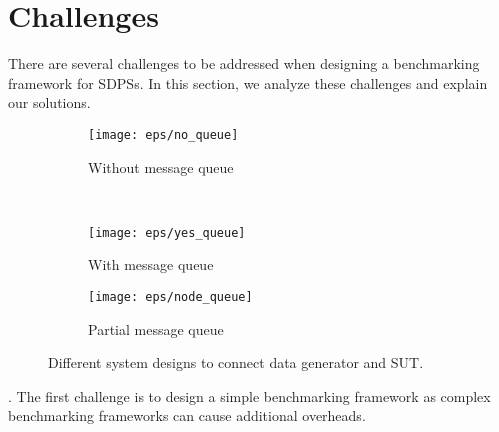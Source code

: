 \section{Challenges}
\label{chal}
There are several challenges to be addressed when designing a benchmarking framework for SDPSs. In this section, we analyze these challenges and explain our solutions.

\begin{figure*}
    \centering
    \begin{subfigure}[b]{0.32\textwidth}
        \texttt{[image: eps/no\_queue]}
        \caption{Without message queue}
        \label{fig_no_queue}
    \end{subfigure}
    ~ %
    \begin{subfigure}[b]{0.32\textwidth}
        \texttt{[image: eps/yes\_queue]}
        \caption{With message queue}
        \label{fig_yes_queue}
    \end{subfigure}
    \begin{subfigure}[b]{0.32\textwidth}
        \texttt{[image: eps/node\_queue]}
        \caption{Partial message queue}
        \label{fig_partial_queue}
    \end{subfigure}
        \caption{Different system designs to connect data generator and SUT. }
            \label{fig_queue_link}
\end{figure*}



. The first challenge is to design a simple benchmarking framework as complex benchmarking frameworks can  cause  additional overheads.  

